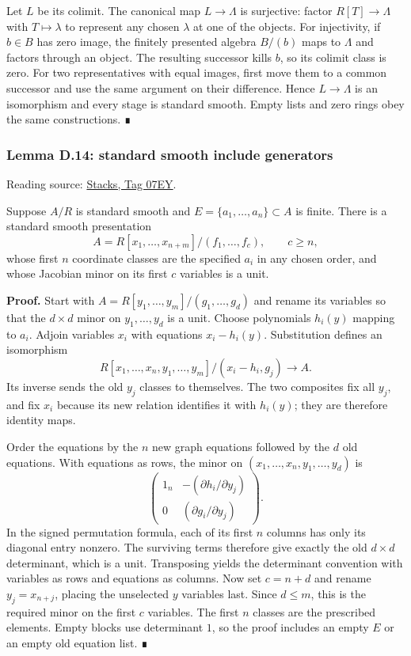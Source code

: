 \documentclass[11pt,a4paper,openany]{report}
\begin{document}
Let \(L\) be its colimit. The canonical map \(L\to\Lambda\) is surjective: factor \(R[T]\to\Lambda\) with \(T\mapsto\lambda\) to represent any chosen \(\lambda\) at one of the objects. For injectivity, if \(b\in B\) has zero image, the finitely presented algebra \(B/(b)\) maps to \(\Lambda\) and factors through an object. The resulting successor kills \(b\), so its colimit class is zero. For two representatives with equal images, first move them to a common successor and use the same argument on their difference. Hence \(L\to\Lambda\) is an isomorphism and every stage is standard smooth. Empty lists and zero rings obey the same constructions. ∎

\label{AG-RG-S05-smoothing-lemma-standard-smooth-include-generators}

\subsubsection{Lemma D.14: standard smooth include generators}\label{AG-RG-S05-lemma-d.14-standard-smooth-include-generators}

Reading source: \href{https://stacks.math.columbia.edu/tag/07EY}{Stacks, Tag 07EY}.

Suppose \(A/R\) is standard smooth and \(E=\{a_1,\ldots,a_n\}\subset A\) is finite. There is a standard smooth presentation \[A=R[x_1,\ldots,x_{n+m}]/(f_1,\ldots,f_c),\qquad c\ge n,\] whose first \(n\) coordinate classes are the specified \(a_i\) in any chosen order, and whose Jacobian minor on its first \(c\) variables is a unit.

\textbf{Proof.} Start with \(A=R[y_1,\ldots,y_m]/(g_1,\ldots,g_d)\) and rename its variables so that the \(d\times d\) minor on \(y_1,\ldots,y_d\) is a unit. Choose polynomials \(h_i(y)\) mapping to \(a_i\). Adjoin variables \(x_i\) with equations \(x_i-h_i(y)\). Substitution defines an isomorphism \[R[x_1,\ldots,x_n,y_1,\ldots,y_m]/(x_i-h_i,g_j)\longrightarrow A.\] Its inverse sends the old \(y_j\) classes to themselves. The two composites fix all \(y_j\), and fix \(x_i\) because its new relation identifies it with \(h_i(y)\); they are therefore identity maps.

Order the equations by the \(n\) new graph equations followed by the \(d\) old equations. With equations as rows, the minor on \((x_1,\ldots,x_n,y_1,\ldots,y_d)\) is \[\begin{pmatrix}1_n&-(\partial h_i/\partial y_j)\\0&(\partial g_i/\partial y_j)\end{pmatrix}.\] In the signed permutation formula, each of its first \(n\) columns has only its diagonal entry nonzero. The surviving terms therefore give exactly the old \(d\times d\) determinant, which is a unit. Transposing yields the determinant convention with variables as rows and equations as columns. Now set \(c=n+d\) and rename \(y_j=x_{n+j}\), placing the unselected \(y\) variables last. Since \(d\le m\), this is the required minor on the first \(c\) variables. The first \(n\) classes are the prescribed elements. Empty blocks use determinant \(1\), so the proof includes an empty \(E\) or an empty old equation list. ∎
\end{document}
